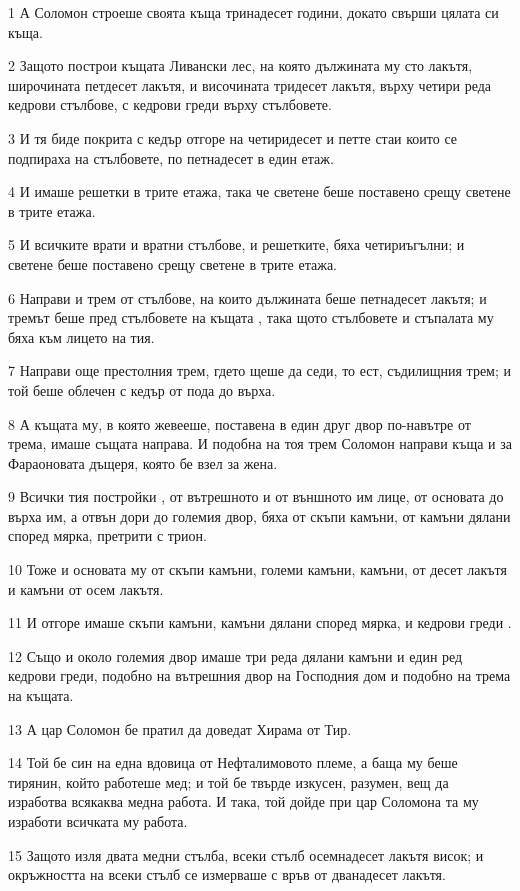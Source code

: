 \par 1 А Соломон строеше своята къща тринадесет години, докато свърши цялата си къща.
\par 2 Защото построи къщата Ливански лес, на която дължината му сто лакътя, широчината петдесет лакътя, и височината тридесет лакътя, върху четири реда кедрови стълбове, с кедрови греди върху стълбовете.
\par 3 И тя биде покрита с кедър отгоре на четиридесет и петте стаи които се подпираха на стълбовете, по петнадесет в един етаж.
\par 4 И имаше решетки в трите етажа, така че светене беше поставено срещу светене в трите етажа.
\par 5 И всичките врати и вратни стълбове, и решетките, бяха четириъгълни; и светене беше поставено срещу светене в трите етажа.
\par 6 Направи и трем от стълбове, на които дължината беше петнадесет лакътя; и тремът беше пред стълбовете на къщата , така щото стълбовете и стъпалата му бяха към лицето на тия.
\par 7 Направи още престолния трем, гдето щеше да седи, то ест, съдилищния трем; и той беше облечен с кедър от пода до върха.
\par 8 А къщата му, в която жевееше, поставена в един друг двор по-навътре от трема, имаше същата направа. И подобна на тоя трем Соломон направи къща и за Фараоновата дъщеря, която бе взел за жена.
\par 9 Всички тия постройки , от вътрешното и от външното им лице, от основата до върха им, а отвън дори до големия двор, бяха от скъпи камъни, от камъни дялани според мярка, претрити с трион.
\par 10 Тоже и основата му от скъпи камъни, големи камъни, камъни, от десет лакътя и камъни от осем лакътя.
\par 11 И отгоре имаше скъпи камъни, камъни дялани според мярка, и кедрови греди .
\par 12 Също и около големия двор имаше три реда дялани камъни и един ред кедрови греди, подобно на вътрешния двор на Господния дом и подобно на трема на къщата.
\par 13 А цар Соломон бе пратил да доведат Хирама от Тир.
\par 14 Той бе син на една вдовица от Нефталимовото племе, а баща му беше тирянин, който работеше мед; и той бе твърде изкусен, разумен, вещ да изработва всякаква медна работа. И така, той дойде при цар Соломона та му изработи всичката му работа.
\par 15 Защото изля двата медни стълба, всеки стълб осемнадесет лакътя висок; и окръжността на всеки стълб се измерваше с връв от дванадесет лакътя.
